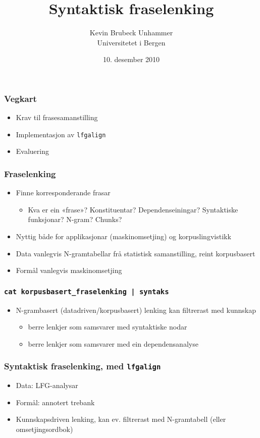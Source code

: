 \documentclass[bigger]{beamer}
\title{Syntaktisk fraselenking}
\author{Kevin Brubeck Unhammer\\ Universitetet i Bergen}
\date{10. desember 2010}
\begin{document}
\maketitle

\begin{frame}\frametitle{Vegkart}
  \begin{itemize}
  \item Krav til frasesamanstilling
  \item Implementasjon av \texttt{lfgalign}
  \item Evaluering
  \end{itemize}
\end{frame}

\begin{frame}\frametitle{Fraselenking}
    \begin{itemize}
    \item Finne korresponderande frasar
      \begin{itemize}
      \item Kva er ein «frase»? Konstituentar? Dependenseiningar?
        Syntaktiske funksjonar? N-gram? Chunks?
      \end{itemize}
    \item Nyttig både for applikasjonar (maskinomsetjing) og
      korpuslingvistikk
    \item Data vanlegvis N-gramtabellar frå statistisk samanstilling,
      reint korpusbasert
    \item Formål vanlegvis maskinomsetjing
    \end{itemize}
\end{frame}

\begin{frame}\frametitle{\texttt{cat korpusbasert\_fraselenking | syntaks}}
    \begin{itemize}
    \item N-grambasert (datadriven/korpusbasert) lenking kan filtrerast med kunnskap
      \begin{itemize}
       \item berre lenkjer som samsvarer med syntaktiske nodar \citep{samuelsson2007apa}
       \item berre lenkjer som samsvarer med ein dependensanalyse \citep{hearne2008ccd}
      \end{itemize}
    \end{itemize}
  \end{frame}

\begin{frame}\frametitle{Syntaktisk fraselenking, med \texttt{lfgalign}}
  \begin{itemize}
  \item Data: LFG-analysar
  \item Formål: annotert trebank
  \item Kunnskapsdriven lenking, kan ev. filtrerast med N-gramtabell (eller omsetjingsordbok)
  \end{itemize}
\end{frame}
\end{document}
